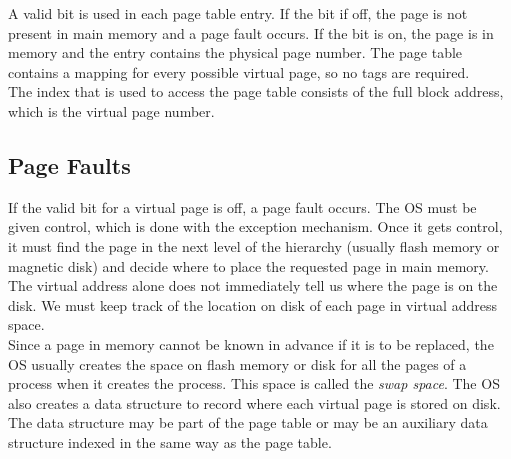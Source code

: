 \documentclass[12pt]{article}
\theoremstyle{definition}
\begin{document}
  \begin{figure}[H]
  \end{figure}

  A valid bit is used in each page table entry.
  If the bit if off, the page is not present in main memory and a page fault occurs.
  If the bit is on, the page is in memory and the entry contains the physical page number.
  The page table contains a mapping for every possible virtual page, so no tags are required. \\
  The index that is used to access the page table consists of the full block address, which is the virtual page number.

  \subsection{Page Faults}
  If the valid bit for a virtual page is off, a page fault occurs.
  The OS must be given control, which is done with the exception mechanism.
  Once it gets control, it must find the page in the next level of the hierarchy (usually flash memory or magnetic disk) and decide where to place the requested page in main memory. \\

  The virtual address alone does not immediately tell us where the page is on the disk.
  We must keep track of the location on disk of each page in virtual address space. \\

  Since a page in memory cannot be known in advance if it is to be replaced, the OS usually creates the space on flash memory or disk for all the pages of a process when it creates the process.
  This space is called the \emph{swap space}.
  The OS also creates a data structure to record where each virtual page is stored on disk.
  The data structure may be part of the page table or may be an auxiliary data structure indexed in the same way as the page table.
\end{document}
